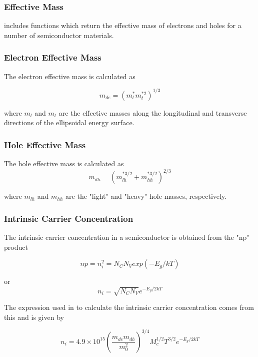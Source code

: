 \subsubsection{Effective Mass}
\Xyce{} includes functions which return the effective mass of electrons and
holes for a number of semiconductor materials.

\subsubsection{Electron Effective Mass}
The electron effective mass is calculated as

\begin{equation}
 m_{de} = (m_{l}^{*} m_{t}^{*2})^{1/3}
\end{equation}

where $m_{l}$ and $m_{t}$ are the effective masses along the longitudinal
and transverse directions of the ellipsoidal energy surface.

\subsubsection{Hole Effective Mass}
The hole effective mass is calculated as
\begin{equation}
  m_{dh} = (m_{lh}^{*3/2} + m_{hh}^{*3/2})^{2/3}
\end{equation}

where $m_{lh}$ and $m_{hh}$ are the "light" and "heavy" hole masses,
respectively.

\subsubsection{Intrinsic Carrier Concentration}

The intrinsic carrier concentration in a semiconductor is obtained from the
"np" product

\begin{equation}
  np = n_{i}^{2} = N_{C}N_{V} exp(-E_{g}/kT)
\end{equation}

or
\begin{equation}
 n_{i} = \sqrt{N_{C}N_{V}} e^{-E_{g}/2kT}
\end{equation}

The expression used in \Xyce{} to calculate the intrinsic carrier
concentration comes from this and is given by

\begin{equation}
  n_{i} = 4.9 \times 10^{15} (\frac{m_{de}m_{dh}}{m_{0}^{2}})^{3/4} M_{c}^{1/2}
  T^{3/2} e^{-E_{g}/2kT}
\end{equation}

